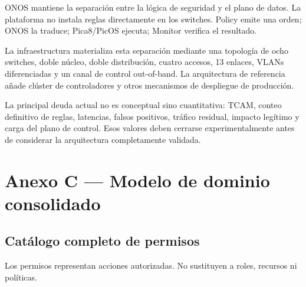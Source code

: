 \documentclass[11pt,a4paper]{article}
\begin{document}
ONOS mantiene la separación entre la lógica de seguridad y el plano de datos. La plataforma no instala reglas directamente en los switches. Policy emite una orden; ONOS la traduce; Pica8/PicOS ejecuta; Monitor verifica el resultado.

La infraestructura materializa esta separación mediante una topología de ocho switches, doble núcleo, doble distribución, cuatro accesos, 13 enlaces, VLANs diferenciadas y un canal de control out-of-band. La arquitectura de referencia añade clúster de controladores y otros mecanismos de despliegue de producción.

La principal deuda actual no es conceptual sino cuantitativa: TCAM, conteo definitivo de reglas, latencias, falsos positivos, tráfico residual, impacto legítimo y carga del plano de control. Esos valores deben cerrarse experimentalmente antes de considerar la arquitectura completamente validada.

\section{Anexo C --- Modelo de dominio consolidado}

\subsection{Catálogo completo de permisos}

Los permisos representan acciones autorizadas. No sustituyen a roles, recursos ni políticas.
\end{document}
